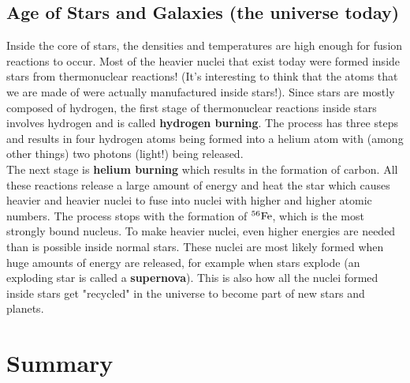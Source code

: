 \subsection{Age of Stars and Galaxies (the universe today)}
Inside the core of stars, the densities and temperatures are high enough for fusion reactions to occur. Most of the heavier nuclei that exist today were formed inside stars from thermonuclear reactions! (It's interesting to think that the atoms that we are made of were actually manufactured inside stars!). Since stars are mostly composed of hydrogen, the first stage of thermonuclear reactions inside stars involves hydrogen and is called \textbf{hydrogen burning}. The process has three steps and results in four hydrogen atoms being formed into a helium atom with (among other things) two photons (light!) being released. \\

The next stage is \textbf{helium burning} which results in the formation of carbon. All these reactions release a large amount of energy and heat the star which causes heavier and heavier nuclei to fuse into nuclei with higher and higher atomic numbers. The process stops with the formation of $^{56}\rm{Fe}$, which is the most strongly bound nucleus. To make heavier nuclei, even higher energies are needed than is possible inside normal stars. These nuclei are most likely formed when huge amounts of energy are released, for example when stars explode (an exploding star is called a \textbf{supernova}). This is also how all the nuclei formed inside stars get "recycled" in the universe to become part of new stars and planets.

\section{Summary}

